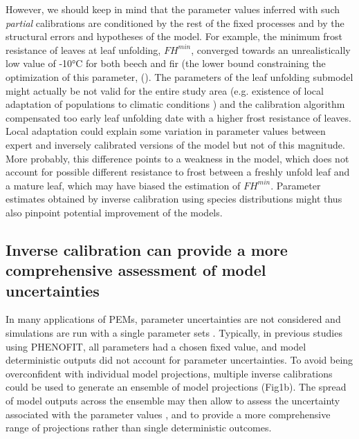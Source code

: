 \documentclass[letterpaper,8pt]{extarticle}  %
\begin{document}
\begin{doublespacing}
\begin{linenumbers}
However, we should keep in mind that the parameter values inferred with such \emph{partial} calibrations are conditioned by the rest of the fixed processes and by the structural errors and hypotheses of the model. For example, the minimum frost resistance of leaves at leaf unfolding, ${FH}^{min}$, converged towards an unrealistically low value of -10°C for both beech and fir (the lower bound constraining the optimization of this parameter, (). The parameters of the leaf unfolding submodel might actually be not valid for the entire study area (e.g. existence of local adaptation of populations to climatic conditions \citep{Kreyling2014}) and the calibration algorithm compensated too early leaf unfolding date with a higher frost resistance of leaves. Local adaptation could explain some variation in parameter values between expert and inversely calibrated versions of the model but not of this magnitude. More probably, this difference points to a weakness in the model, which does not account for possible different resistance to frost between a freshly unfold leaf and a mature leaf, which may have biased the estimation of ${FH}^{min}$. Parameter estimates obtained by inverse calibration using species distributions might thus also pinpoint potential improvement of the models.


\subsection{Inverse calibration can provide a more comprehensive assessment of model uncertainties}

In many applications of PEMs, parameter uncertainties are not considered and simulations are run with a single parameter sets \citep{Niu2014, Lobell2010}. Typically, in previous studies using PHENOFIT, all parameters had a chosen fixed value, and model deterministic outputs did not account for parameter uncertainties. To avoid being overconfident with individual model projections, multiple inverse calibrations could be used to generate an ensemble of model projections (Fig1b). The spread of model outputs across the ensemble may then allow to assess the uncertainty associated with the parameter values \citep{Simmonds2024}, and to provide a more comprehensive range of projections rather than single deterministic outcomes.


\end{linenumbers}
\end{doublespacing}
\end{document}
